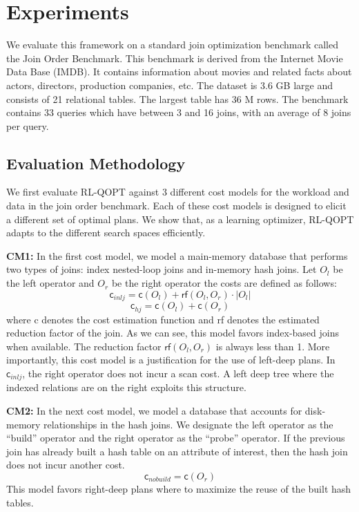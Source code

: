 \section{Experiments}
We evaluate this framework on a standard join optimization benchmark called the Join Order Benchmark. This benchmark is derived from the Internet Movie Data Base
(IMDB). It contains information
about movies and related facts about actors, directors,
production companies, etc. 
The dataset is 3.6 GB large and consists of 21 relational tables.
The largest table has
36 M rows.
The benchmark contains 33 queries which have between 3 and 16 joins, with an average of 8 joins
per query. 

\subsection*{Evaluation Methodology}
We first evaluate RL-QOPT against 3 different cost models for the workload and data in the join order benchmark. Each of these cost models is designed to elicit a different set of optimal plans. 
We show that, as a learning optimizer, RL-QOPT adapts to the different search spaces efficiently.

\vspace{0.25em} \noindent \textbf{CM1: } In the first cost model, we model a main-memory database that performs two types of joins: index nested-loop joins and in-memory hash joins. Let $O_l$ be the left operator and $O_r$ be the right operator the costs are defined as follows:
\[
\textsf{c}_{inlj} = \textsf{c}(O_l) + \textsf{rf}(O_l, O_r) \cdot |O_l|
\]
\[
\textsf{c}_{hj} = \textsf{c}(O_l) + \textsf{c}(O_r)
\]
where \textsf{c} denotes the cost estimation function and \textsf{rf} denotes the estimated reduction factor of the join.
As we can see, this model favors index-based joins when available. 
The reduction factor $\textsf{rf}(O_l, O_r)$ is always less than 1.
More importantly, this cost model is a justification for the use of left-deep plans.
In $\textsf{c}_{inlj}$, the right operator does not incur a scan cost.
A left deep tree where the indexed relations are on the right exploits this structure.


\vspace{0.25em} \noindent \textbf{CM2: } In the next cost model, we model a database that accounts for disk-memory relationships in the hash joins. We designate the left operator as the ``build'' operator and the right operator as the ``probe'' operator. 
If the previous join has already built a hash table on an attribute of interest, then the hash join does not incur another cost.
\[
\textsf{c}_{nobuild} = \textsf{c}(O_r)
\]
This model favors right-deep plans where to maximize the reuse of the built hash tables.



